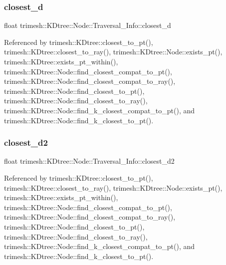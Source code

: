 \subsubsection{\texorpdfstring{closest\+\_\+d}{closest\_d}}
{\footnotesize\ttfamily float trimesh\+::\+K\+Dtree\+::\+Node\+::\+Traversal\+\_\+\+Info\+::closest\+\_\+d}



Referenced by trimesh\+::\+K\+Dtree\+::closest\+\_\+to\+\_\+pt(), trimesh\+::\+K\+Dtree\+::closest\+\_\+to\+\_\+ray(), trimesh\+::\+K\+Dtree\+::\+Node\+::exists\+\_\+pt(), trimesh\+::\+K\+Dtree\+::exists\+\_\+pt\+\_\+within(), trimesh\+::\+K\+Dtree\+::\+Node\+::find\+\_\+closest\+\_\+compat\+\_\+to\+\_\+pt(), trimesh\+::\+K\+Dtree\+::\+Node\+::find\+\_\+closest\+\_\+compat\+\_\+to\+\_\+ray(), trimesh\+::\+K\+Dtree\+::\+Node\+::find\+\_\+closest\+\_\+to\+\_\+pt(), trimesh\+::\+K\+Dtree\+::\+Node\+::find\+\_\+closest\+\_\+to\+\_\+ray(), trimesh\+::\+K\+Dtree\+::\+Node\+::find\+\_\+k\+\_\+closest\+\_\+compat\+\_\+to\+\_\+pt(), and trimesh\+::\+K\+Dtree\+::\+Node\+::find\+\_\+k\+\_\+closest\+\_\+to\+\_\+pt().

\mbox{\label{structtrimesh_1_1KDtree_1_1Node_1_1Traversal__Info_a532ad5209c6ca76863e9c3b3c195c7a5}} 
\subsubsection{\texorpdfstring{closest\+\_\+d2}{closest\_d2}}
{\footnotesize\ttfamily float trimesh\+::\+K\+Dtree\+::\+Node\+::\+Traversal\+\_\+\+Info\+::closest\+\_\+d2}



Referenced by trimesh\+::\+K\+Dtree\+::closest\+\_\+to\+\_\+pt(), trimesh\+::\+K\+Dtree\+::closest\+\_\+to\+\_\+ray(), trimesh\+::\+K\+Dtree\+::\+Node\+::exists\+\_\+pt(), trimesh\+::\+K\+Dtree\+::exists\+\_\+pt\+\_\+within(), trimesh\+::\+K\+Dtree\+::\+Node\+::find\+\_\+closest\+\_\+compat\+\_\+to\+\_\+pt(), trimesh\+::\+K\+Dtree\+::\+Node\+::find\+\_\+closest\+\_\+compat\+\_\+to\+\_\+ray(), trimesh\+::\+K\+Dtree\+::\+Node\+::find\+\_\+closest\+\_\+to\+\_\+pt(), trimesh\+::\+K\+Dtree\+::\+Node\+::find\+\_\+closest\+\_\+to\+\_\+ray(), trimesh\+::\+K\+Dtree\+::\+Node\+::find\+\_\+k\+\_\+closest\+\_\+compat\+\_\+to\+\_\+pt(), and trimesh\+::\+K\+Dtree\+::\+Node\+::find\+\_\+k\+\_\+closest\+\_\+to\+\_\+pt().

